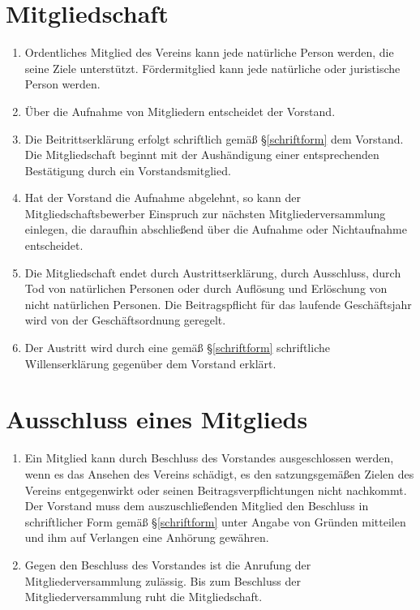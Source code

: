 \documentclass[fontsize=12pt,paper=a4,pagesize]{scrartcl}
\begin{document}
\section{Mitgliedschaft}
\begin{enumerate}
	\item Ordentliches Mitglied des Vereins kann jede natürliche Person werden,
		die seine Ziele unterstützt. Fördermitglied kann jede natürliche oder
		juristische Person werden.

	\item Über die Aufnahme von Mitgliedern entscheidet der Vorstand.

	\item Die Beitrittserklärung erfolgt schriftlich gemäß §\ref{schriftform}
		dem Vorstand. Die Mitgliedschaft beginnt mit der Aushändigung einer
		entsprechenden Bestätigung durch ein Vorstandsmitglied.

	\item Hat der Vorstand die Aufnahme abgelehnt, so kann der
		Mitgliedschaftsbewerber Einspruch zur nächsten Mitgliederversammlung
		einlegen, die daraufhin abschließend über die Aufnahme oder Nichtaufnahme
		entscheidet.

	\item Die Mitgliedschaft endet durch Austrittserklärung, durch
		Ausschluss, durch Tod von natürlichen Personen oder durch Auflösung
		und Erlöschung von nicht natürlichen Personen. Die Beitragspflicht
		für das laufende Geschäftsjahr wird von der Geschäftsordnung geregelt.

	\item Der Austritt wird durch eine gemäß §\ref{schriftform}
		schriftliche Willenserklärung gegenüber dem Vorstand erklärt.

\end{enumerate}

\section{Ausschluss eines Mitglieds}
\begin{enumerate}
	\item Ein Mitglied kann durch Beschluss des Vorstandes ausgeschlossen
		werden, wenn es das Ansehen des Vereins schädigt, es den satzungsgemäßen
		Zielen des Vereins entgegenwirkt oder seinen Beitragsverpflichtungen
		nicht nachkommt. Der Vorstand muss dem auszuschließenden Mitglied den
		Beschluss in schriftlicher Form gemäß §\ref{schriftform} unter Angabe von Gründen
		mitteilen und ihm auf Verlangen eine Anhörung gewähren.

	\item Gegen den Beschluss des Vorstandes ist die Anrufung der
		Mitgliederversammlung zulässig. Bis zum Beschluss der
		Mitgliederversammlung ruht die Mitgliedschaft.
\end{enumerate}
\end{document}
